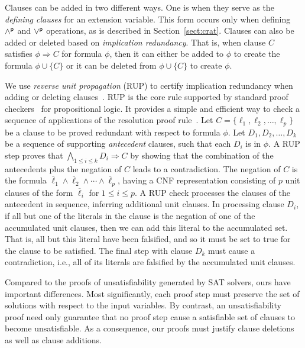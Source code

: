 \documentclass[letterpaper,USenglish,cleveref, autoref, thm-restate]{lipics-v2021}
\newcommand{\pand}{\mathbin{\land^{\sf p}}}
\newcommand{\por}{\mathbin{\lor^{\sf p}}}
\newcommand{\obar}[1]{\overline{#1}}
\newcommand{\lit}{\ell}
\newcommand{\imply}{\Rightarrow}
\begin{document}
Clauses can be added in two different ways.  One is when they serve as
the {\em defining clauses} for an extension variable.  This form
occurs only when defining $\pand$ and $\por$ operations, as is
described in Section~\ref{sect:crat}.  Clauses can also be added or
deleted based on {\em implication redundancy}.  That is, when clause
$C$ satisfies $\phi \imply C$ for formula $\phi$, then it can either
be added to $\phi$ to create the formula $\phi \cup \{C\}$ or it can be deleted
from $\phi \cup \{C\}$ to create $\phi$.

We use {\em reverse unit propagation} (RUP) to certify
implication redundancy when adding or deleting
clauses~\cite{goldberg,vangelder08_verifying_rup_proofs}.
RUP
is the core rule supported by standard
proof checkers~\cite{RAT,wetzler14_drattrim} for propositional logic. It provides a simple and efficient
way to check a sequence of applications of the resolution proof rule~\cite{robinson-1965}.
Let $C = \{\lit_1, \lit_2, \ldots,\lit_p\}$ be a clause to be
proved redundant with respect to formula $\phi$.  Let $D_1, D_2, \ldots, D_k$ be a sequence of supporting
{\em antecedent} clauses, such that each $D_i$ is in $\phi$.
A RUP step
proves that $\bigwedge_{1\leq i \leq k} D_i \imply C$ by showing
that the combination of the antecedents plus the negation of $C$ leads
to a contradiction.  The negation of $C$ is the formula
$\overline{\lit}_1 \land \overline{\lit}_2 \land \cdots \land
\overline{\lit}_p$, having a CNF representation consisting of $p$ unit
clauses of the form $\obar{\lit}_i$ for $1 \leq i \leq p$.  A RUP
check processes the clauses of the antecedent in sequence, inferring
additional unit clauses.  In processing clause $D_i$, if all but one
of the literals in the clause is the negation of one of the
accumulated unit clauses, then we can add this literal to the
accumulated set.  That is, all but this literal have been falsified,
and so it must be set to true for the clause to be satisfied.  The
final step with clause $D_k$ must cause a contradiction, i.e., all of
its literals are falsified by the accumulated unit clauses.

Compared to the proofs of unsatisfiability generated by SAT solvers,
ours have important differences.  Most
significantly, each proof step must preserve the set of solutions with respect to the input variables.
By contrast, an unsatisfiability proof need only guarantee that
no proof step cause a satisfiable set of clauses to become
unsatisfiable.  As a consequence, our proofs must justify clause deletions as well as clause additions.
\end{document}
